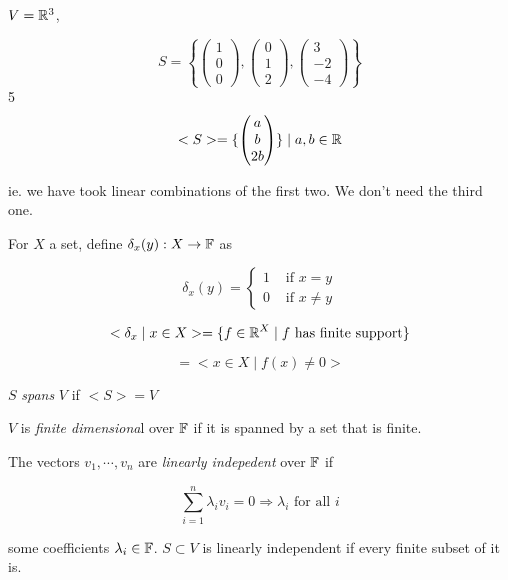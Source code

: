 \documentclass[a4paper]{article}
\begin{document}
\begin{eg}
	$ V = \mathbb{R}^{3} $, 
	
	\[ S = \left\{ \begin{pmatrix}
	1 \\
	0 \\
	0
	
	\end{pmatrix}, \begin{pmatrix}
	0\\
	1\\
	2
	
	\end{pmatrix}, \begin{pmatrix}
	3\\
	-2\\
	-4
	\end{pmatrix} \right\}  \]
	5
	\[ <S> = \{ \begin{pmatrix}
	a\\
	b\\
	2b
	\end{pmatrix} \} \; | \; a,b \in \mathbb{R} \]
	
	ie. we have took linear combinations of the first two. We don't need the third one.
	
\end{eg}



\begin{eg}
	For $ X $ a set, define $ \delta_{x}(y) : X \to \mathbb{F} $ as 
	
	
	\[ \delta_{x}(y) = \begin{cases} 1  & \text{ if } x = y \\ 0  & \text{ if } x \neq y \end{cases}  \]
	
	\[ < \delta_{x} \; | \; x \in X > = \{  f \in \mathbb{R}^{X} \; | \; f \text{ has finite support} \}  \]
	
	\[ = <  x \in X \; | \; f(x) \neq 0 > \]
\end{eg}

\begin{defi}
	$ S $ \emph{spans} $ V $ if $ <S> = V $
\end{defi}

\begin{defi}
	$ V $ is \emph{finite dimensiona}l over $ \mathbb{F} $ if it is spanned by a set that is finite.
\end{defi}

\begin{defi}
	The vectors $ v_{1},\cdots,v_{n} $ are \emph{linearly indepedent} over $ \mathbb{F} $ if 
	
	\[ \sum_{i = 1}^{n} \lambda_{i} v_{i} = 0 \Rightarrow \lambda_{i} \text{ for all } i \]
	
	some coefficients $ \lambda_{i} \in \mathbb{F}  $. $ S \subset V $ is linearly independent if every finite subset of it is. 
\end{defi}
\end{document}
